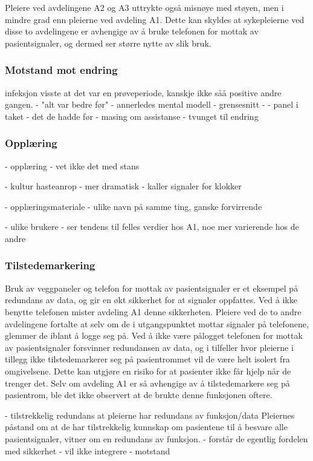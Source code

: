 \noindent
Pleiere ved avdelingene A2 og A3 uttrykte også misnøye med støyen, men i mindre grad enn pleierne ved avdeling A1. Dette kan skyldes at sykepleierne ved disse to avdelingene er avhengige av å bruke telefonen for mottak av pasientsignaler, og dermed ser større nytte av slik bruk. 

\subsubsection{Motstand mot endring}


	 infeksjon visste at det var en prøveperiode, kanskje ikke såå positive andre gangen.
	 	- "alt var bedre før"
	 	- annerledes mental modell
	 	- grensesnitt
	 	- - panel i taket
		- det de hadde før
		- masing om assistanse
		- tvunget til endring

	 	

\subsubsection{Opplæring}	 	
- opplæring 
	- vet ikke det med stans
	
- kultur hasteanrop
	- mer dramatisk
	- kaller signaler for klokker

- opplæringsmateriale - ulike navn på samme ting, ganske forvirrende

- ulike brukere
	- ser tendens til felles verdier hos A1, noe mer varierende hos de andre

\subsubsection{Tilstedemarkering}
Bruk av veggpaneler og telefon for mottak av pasientsignaler er et eksempel på redundans av data, og gir en økt sikkerhet for at signaler oppfattes. Ved å ikke benytte telefonen mister avdeling A1 denne sikkerheten. Pleiere ved de to andre avdelingene fortalte at selv om de i utgangspunktet mottar signaler på telefonene, glemmer de iblant å logge seg på. Ved å ikke være pålogget telefonen for mottak av pasientsignaler forsvinner redundansen av data, og i tilfeller hvor pleierne i tillegg ikke tilstedemarkerer seg på pasientrommet vil de være helt isolert fra omgivelsene. Dette kan utgjøre en risiko for at pasienter ikke får hjelp når de trenger det. Selv om avdeling A1 er så avhengige av å tilstedemarkere seg på pasientrom, ble det ikke observert at de brukte denne funksjonen oftere. 

- tilstrekkelig redundans at pleierne har redundans av funksjon/data
	Pleiernes påstand om at de har tilstrekkelig kunnskap om pasientene til å besvare alle pasientsignaler, vitner om en redundans av funksjon. 
- forstår de egentlig fordelen med sikkerhet
	- vil ikke integrere
	- motstand

